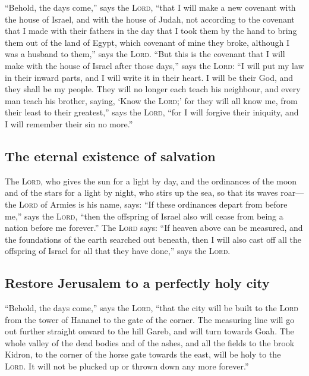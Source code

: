  ``Behold, the days come,'' says the \textsc{Lord},
``that I will make a new covenant with the house of Israel, and with the
house of Judah,  not according to the covenant that I
made with their fathers in the day that I took them by the hand to bring
them out of the land of Egypt, which covenant of mine they broke,
although I was a husband to them,'' says the \textsc{Lord}.
 ``But this is the covenant that I will make with the
house of Israel after those days,'' says the \textsc{Lord}: ``I will put
my law in their inward parts, and I will write it in their heart. I will
be their God, and they shall be my people.  They will no
longer each teach his neighbour, and every man teach his brother,
saying, `Know the \textsc{Lord};' for they will all know me, from their
least to their greatest,'' says the \textsc{Lord}, ``for I will forgive
their iniquity, and I will remember their sin no more.''

\hypertarget{the-eternal-existence-of-salvation}{%
\subsection{The eternal existence of
salvation}\label{the-eternal-existence-of-salvation}}

 The \textsc{Lord}, who gives the sun for a light by day,
and the ordinances of the moon and of the stars for a light by night,
who stirs up the sea, so that its waves roar--- the \textsc{Lord} of
Armies is his name, says:  ``If these ordinances depart
from before me,'' says the \textsc{Lord}, ``then the offspring of Israel
also will cease from being a nation before me forever.'' 
The \textsc{Lord} says: ``If heaven above can be measured, and the
foundations of the earth searched out beneath, then I will also cast off
all the offspring of Israel for all that they have done,'' says the
\textsc{Lord}.

\hypertarget{restore-jerusalem-to-a-perfectly-holy-city}{%
\subsection{Restore Jerusalem to a perfectly holy
city}\label{restore-jerusalem-to-a-perfectly-holy-city}}

 ``Behold, the days come,'' says the \textsc{Lord},
``that the city will be built to the \textsc{Lord} from the tower of
Hananel to the gate of the corner.  The measuring line
will go out further straight onward to the hill Gareb, and will turn
towards Goah.  The whole valley of the dead bodies and of
the ashes, and all the fields to the brook Kidron, to the corner of the
horse gate towards the east, will be holy to the \textsc{Lord}. It will
not be plucked up or thrown down any more forever.''


